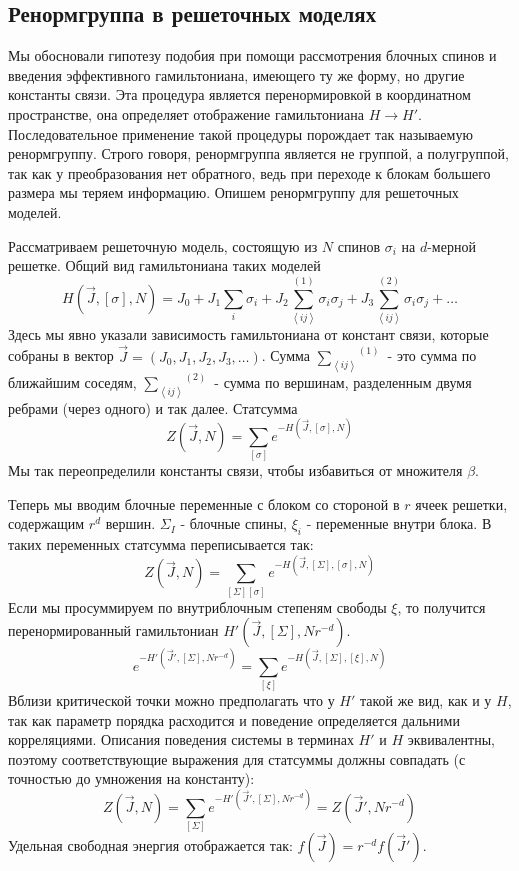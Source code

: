 \documentclass[a4paper,12pt]{article} \usepackage[utf8x]{inputenc} \usepackage[russian]{babel}
\theoremstyle{definition} \newtheorem{corollary}{Corollary}[theorem] \theoremstyle{definition}
\begin{document}
\subsection{Ренормгруппа в решеточных моделях}
\label{sec:renormgroup-lattice-models} Мы обосновали гипотезу подобия при помощи рассмотрения
блочных спинов и введения эффективного гамильтониана, имеющего ту же форму, но другие константы
связи. Эта процедура является перенормировкой в координатном пространстве, она определяет
отображение гамильтониана $H\to H'$. Последовательное применение такой процедуры порождает так
называемую ренормгруппу. Строго говоря, ренормгруппа является не группой, а полугруппой, так как у
преобразования нет обратного, ведь при переходе к блокам большего размера мы теряем информацию.
Опишем ренормгруппу для решеточных моделей.

Рассматриваем решеточную модель, состоящую из $N$ спинов $\sigma_i$ на $d$-мерной решетке. Общий вид
гамильтониана таких моделей
\begin{equation}
  \label{eq:55} H(\vec J,[\sigma],N)=J_0 + J_1\sum_i \sigma_i
+J_2\overset{(1)}{\sum_{\left<ij\right>}}\sigma_i
\sigma_j+J_3\overset{(2)}{\sum_{\left<ij\right>}}\sigma_i \sigma_j + \dots
\end{equation} Здесь мы явно указали зависимость гамильтониана от констант связи, которые собраны в
вектор $\vec J=(J_0,J_1,J_2,J_3,\dots)$. Сумма $\overset{(1)}{\sum_{\left<ij\right>}}$ - это сумма
по ближайшим соседям, $\overset{(2)}{\sum_{\left<ij\right>}}$ - сумма по вершинам, разделенным двумя
ребрами (через одного) и так далее. Статсумма
\begin{equation}
  \label{eq:56} Z(\vec J,N)=\sum_{[\sigma]}e^{-H(\vec J,[\sigma],N)}
\end{equation} Мы так переопределили константы связи, чтобы избавиться от множителя $\beta$.

Теперь мы вводим блочные переменные с блоком со стороной в $r$ ячеек решетки, содержащим $r^d$
вершин. $\Sigma_I$ - блочные спины, $\xi_i$ - переменные внутри блока. В таких переменных статсумма
переписывается так:
\begin{equation}
  \label{eq:57} Z(\vec J,N)=\sum_{[\Sigma][\sigma]}e^{-H(\vec J,[\Sigma],[\sigma],N)}
\end{equation} Если мы просуммируем по внутриблочным степеням свободы $\xi$, то получится
перенормированный гамильтониан $H'(\vec J,[\Sigma],Nr^{-d})$.
\begin{equation}
  \label{eq:58} e^{-H'(\vec J',[\Sigma],Nr^{-d})}=\sum_{[\xi]}e^{-H(\vec J,[\Sigma],[\xi],N)}
\end{equation} Вблизи критической точки можно предполагать что у $H'$ такой же вид, как и у $H$, так
как параметр порядка расходится и поведение определяется дальними корреляциями. Описания поведения
системы в терминах $H'$ и $H$ эквивалентны, поэтому соответствующие выражения для статсуммы должны
совпадать (с точностью до умножения на константу):
\begin{equation}
\label{eq:52} Z(\vec J,N)=\sum_{[\Sigma]}e^{-H'(\vec J',[\Sigma],Nr^{-d})}=Z(\vec J',Nr^{-d})
\end{equation} Удельная свободная энергия отображается так: $f(\vec J)=r^{-d} f(\vec J')$.
\end{document}
